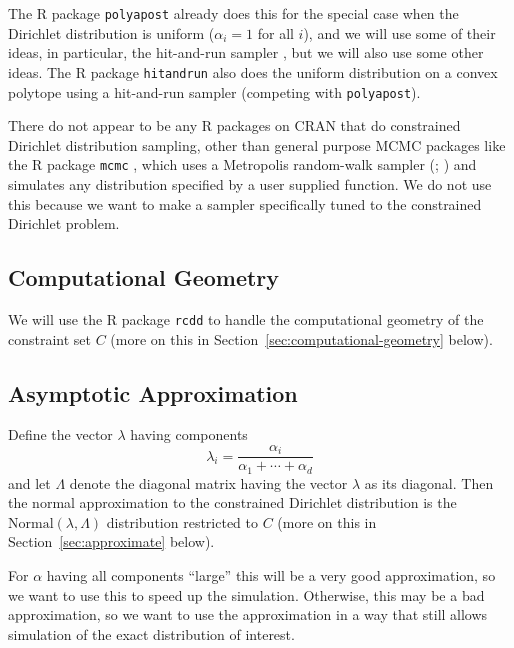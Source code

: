 \documentclass[11pt]{article}
\begin{document}
The R package \texttt{polyapost} \citep{polyapost} already does this
for the special case when the Dirichlet distribution is uniform
($\alpha_i = 1$ for all $i$), and we will use some
of their ideas, in particular, the hit-and-run sampler
\citep*{smith,hit-run-one,hit-run-two}, but we will also use some other ideas.
The R package \texttt{hitandrun} \citep{hitandrun}
also does the uniform distribution on a
convex polytope using a hit-and-run sampler (competing with \texttt{polyapost}).

There do not appear to be any R packages on CRAN that do constrained Dirichlet
distribution sampling, other than general purpose MCMC packages like
the R package \texttt{mcmc} \citep{mcmc}, which uses a Metropolis
random-walk sampler (\citealp{metropolis-et-al};
\citealp[Section~2.3.2]{tierney})
and simulates any distribution specified by a user
supplied function.  We do not use this because we want to make a sampler
specifically tuned to the constrained Dirichlet problem.

\subsection{Computational Geometry}

We will use the R package \texttt{rcdd} \citep*{rcdd} to handle
the computational geometry of the constraint set $C$
(more on this in Section~\ref{sec:computational-geometry} below).

\subsection{Asymptotic Approximation}

Define the vector $\lambda$ having components
\begin{equation} \label{eq:lambda}
   \lambda_i = \frac{\alpha_i}{\alpha_1 + \cdots + \alpha_d}
\end{equation}
and let $\Lambda$ denote the diagonal matrix having the vector $\lambda$
as its diagonal.  Then the normal approximation to the constrained
Dirichlet distribution is
the $\text{Normal}(\lambda, \Lambda)$ distribution
restricted to $C$ \citep[Theorem~4.2]{geyer-meeden}
(more on this in Section~\ref{sec:approximate} below).

For $\alpha$ having
all components ``large'' this will be a very good approximation, so we want
to use this to speed up the simulation.  Otherwise, this may be a bad
approximation, so we want to use the approximation in a way that still
allows simulation of the exact distribution of interest.
\end{document}
